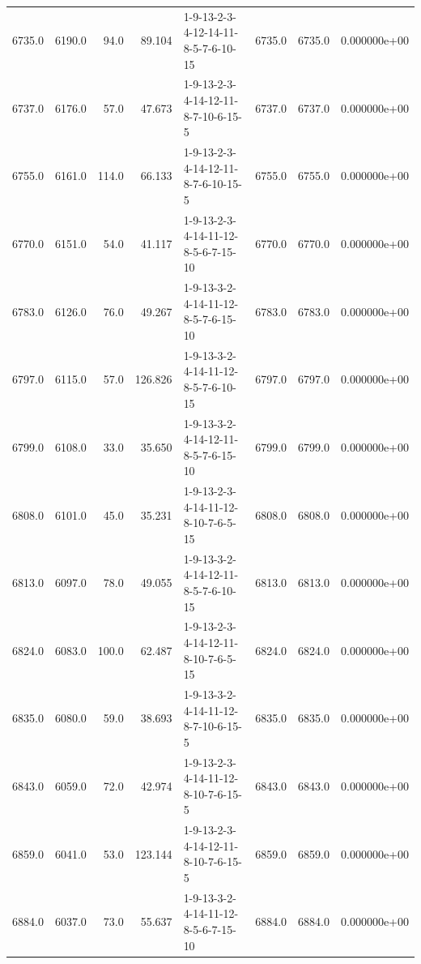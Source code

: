 \begin{tabular}{rrrrlrrr}
 6735.0 &  6190.0 &           94.0 &             89.104 &  1-9-13-2-3-4-12-14-11-8-5-7-6-10-15 &        6735.0 &          6735.0 &  0.000000e+00 \\
 6737.0 &  6176.0 &           57.0 &             47.673 &  1-9-13-2-3-4-14-12-11-8-7-10-6-15-5 &        6737.0 &          6737.0 &  0.000000e+00 \\
 6755.0 &  6161.0 &          114.0 &             66.133 &  1-9-13-2-3-4-14-12-11-8-7-6-10-15-5 &        6755.0 &          6755.0 &  0.000000e+00 \\
 6770.0 &  6151.0 &           54.0 &             41.117 &  1-9-13-2-3-4-14-11-12-8-5-6-7-15-10 &        6770.0 &          6770.0 &  0.000000e+00 \\
 6783.0 &  6126.0 &           76.0 &             49.267 &  1-9-13-3-2-4-14-11-12-8-5-7-6-15-10 &        6783.0 &          6783.0 &  0.000000e+00 \\
 6797.0 &  6115.0 &           57.0 &            126.826 &  1-9-13-3-2-4-14-11-12-8-5-7-6-10-15 &        6797.0 &          6797.0 &  0.000000e+00 \\
 6799.0 &  6108.0 &           33.0 &             35.650 &  1-9-13-3-2-4-14-12-11-8-5-7-6-15-10 &        6799.0 &          6799.0 &  0.000000e+00 \\
 6808.0 &  6101.0 &           45.0 &             35.231 &  1-9-13-2-3-4-14-11-12-8-10-7-6-5-15 &        6808.0 &          6808.0 &  0.000000e+00 \\
 6813.0 &  6097.0 &           78.0 &             49.055 &  1-9-13-3-2-4-14-12-11-8-5-7-6-10-15 &        6813.0 &          6813.0 &  0.000000e+00 \\
 6824.0 &  6083.0 &          100.0 &             62.487 &  1-9-13-2-3-4-14-12-11-8-10-7-6-5-15 &        6824.0 &          6824.0 &  0.000000e+00 \\
 6835.0 &  6080.0 &           59.0 &             38.693 &  1-9-13-3-2-4-14-11-12-8-7-10-6-15-5 &        6835.0 &          6835.0 &  0.000000e+00 \\
 6843.0 &  6059.0 &           72.0 &             42.974 &  1-9-13-2-3-4-14-11-12-8-10-7-6-15-5 &        6843.0 &          6843.0 &  0.000000e+00 \\
 6859.0 &  6041.0 &           53.0 &            123.144 &  1-9-13-2-3-4-14-12-11-8-10-7-6-15-5 &        6859.0 &          6859.0 &  0.000000e+00 \\
 6884.0 &  6037.0 &           73.0 &             55.637 &  1-9-13-3-2-4-14-11-12-8-5-6-7-15-10 &        6884.0 &          6884.0 &  0.000000e+00 \\

\end{tabular}
